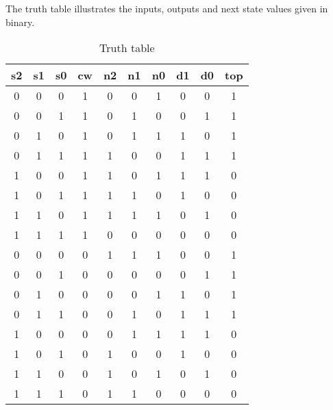 The truth table illustrates the inputs, outputs and next state values given in binary.
\begin{center}
\begin{table}
\begin{tabular}{cccc|cccccc}
s2 & s1 & s0 & cw & n2 & n1 & n0 & d1 & d0 & top\tabularnewline
\hline
\hline 
0 & 0 & 0 & 1 & 0 & 0 & 1 & 0 & 0 & 1\tabularnewline
\hline
0 & 0 & 1 & 1 & 0 & 1 & 0 & 0 & 1 & 1\tabularnewline
\hline 
0 & 1 & 0 & 1 & 0 & 1 & 1 & 1 & 0 & 1\tabularnewline
\hline 
0 & 1 & 1 & 1 & 1 & 0 & 0 & 1 & 1 & 1\tabularnewline
\hline 
1 & 0 & 0 & 1 & 1 & 0 & 1 & 1 & 1 & 0\tabularnewline
\hline 
1 & 0 & 1 & 1 & 1 & 1 & 0 & 1 & 0 & 0\tabularnewline
\hline 
1 & 1 & 0 & 1 & 1 & 1 & 1 & 0 & 1 & 0\tabularnewline
\hline 
1 & 1 & 1 & 1 & 0 & 0 & 0 & 0 & 0 & 0\tabularnewline
\hline 
0 & 0 & 0 & 0 & 1 & 1 & 1 & 0 & 0 & 1\tabularnewline
\hline 
0 & 0 & 1 & 0 & 0 & 0 & 0 & 0 & 1 & 1\tabularnewline
\hline 
0 & 1 & 0 & 0 & 0 & 0 & 1 & 1 & 0 & 1\tabularnewline
\hline 
0 & 1 & 1 & 0 & 0 & 1 & 0 & 1 & 1 & 1\tabularnewline
\hline 
1 & 0 & 0 & 0 & 0 & 1 & 1 & 1 & 1 & 0\tabularnewline
\hline 
1 & 0 & 1 & 0 & 1 & 0 & 0 & 1 & 0 & 0\tabularnewline
\hline 
1 & 1 & 0 & 0 & 1 & 0 & 1 & 0 & 1 & 0\tabularnewline
\hline 
1 & 1 & 1 & 0 & 1 & 1 & 0 & 0 & 0 & 0\tabularnewline
\hline
\end{tabular}
\caption{Truth table \label{table:truth table} }
\end{table}
\end{center}
